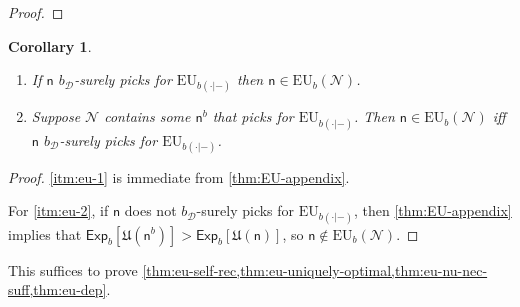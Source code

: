 \documentclass[a4paper,final]{article}
\newtheorem{corollary}[theorem]{Corollary}
\newcommand\Exp{\mathsf{Exp}}
\newcommand\EU{\mathrm{EU}}
\newcommand\U{\mathfrak{U}} %
\newcommand{\D}{\mathcal{D}}
\newcommand{\Decs}{\mathcal{D}}
\newcommand{\n}{\mathsf{n}}
\renewcommand{\nu}{\n}
\newcommand\Nu{\mathcal{N}}
\renewcommand{\leq}{\leqslant}
\newenvironment{CCM rewritten}
{\begingroup\color{blue}} %
{\endgroup}              %
\begin{document}
\begin{proof}
%
%
%
\end{proof}
\begin{corollary}\label{thm:EU-appendix corollary}
	\begin{enumerate}[label=\normalfont(\roman*), ref=(\roman*)]
		\item\label{itm:eu-1} If $\nu$ $b_\Decs$-surely picks for $\EU_{b(\cdot|-)}$ then $\nu\in\EU_b(\Nu)$.
		\item \label{itm:eu-2}Suppose $\Nu$ contains some $\nu^b$ that picks for $\EU_{b(\cdot|-)}$.  Then $\nu\in\EU_b(\Nu)$ iff $\nu$ $b_\Decs$-surely picks for $\EU_{b(\cdot|-)}$.
	\end{enumerate}
\end{corollary}
\begin{proof}
	\ref{itm:eu-1} is immediate from \cref{thm:EU-appendix}. 
	
	For \ref{itm:eu-2}, if $\nu$ does not $b_\Decs$-surely picks for $\EU_{b(\cdot|-)}$, then \cref{thm:EU-appendix} implies that $\Exp_b[\U(\nu^b)]>\Exp_b[\U(\nu)]$, so $\nu\notin\EU_b(\Nu)$. 
\end{proof}

This suffices to prove \cref{thm:eu-self-rec,thm:eu-uniquely-optimal,thm:eu-nu-nec-suff,thm:eu-dep}.

\end{document}

